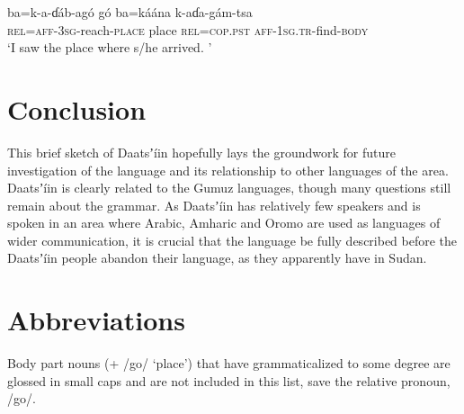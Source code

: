 \documentclass[output=paper]{langsci/langscibook}
\begin{document}
\ea\label{ex:ahlandc:85}
\gll
ba=k-a-ɗ\'{a}b-ag\'{o}    g\'{o}  ba=k\'{a}\'{a}na  k-aɗa-g\'{a}m-tsa  \\
\textsc{rel=aff-3sg}{}-reach-\textsc{place}  place  \textsc{rel=cop.pst}   \textsc{aff-1sg.tr}{}-find-\textsc{body}\\
\glt
‘I saw the place where s/he arrived. ’
\z

\section{Conclusion}\label{sec:ahlandc:12}

This brief sketch of Daatsʼ\'{i}in hopefully lays the groundwork for future investigation of the language and its relationship to other languages of the area. Daatsʼ\'{i}in is clearly related to the Gumuz languages, though many questions still remain about the grammar. As Daatsʼ\'{i}in has relatively few speakers and is spoken in an area where Arabic, Amharic and Oromo are used as languages of wider communication, it is crucial that the language be fully described before the Daatsʼ\'{i}in people abandon their language, as they apparently have in Sudan.

\section*{Abbreviations}

Body part nouns (+ /go/ ‘place’) that have grammaticalized to some degree are glossed in small caps and are not included in this list, save the relative pronoun, /go/.
\end{document}
